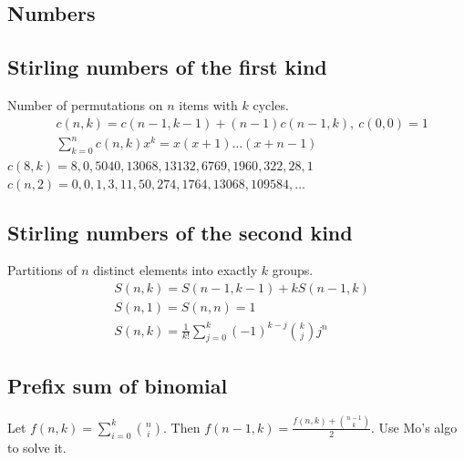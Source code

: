 \begin{compactmath}
\section{Numbers}
\subsection{Stirling numbers of the first kind} %
Number of permutations on $n$ items with $k$ cycles.
\begin{align*}
& c(n,k) = c(n-1,k-1) + (n-1) c(n-1,k),\ c(0,0) = 1 \\
& \textstyle \sum_{k=0}^n c(n,k)x^k = x(x+1) \dots (x+n-1)
\end{align*}
$c(8,k) = 8, 0, 5040, 13068, 13132, 6769, 1960, 322, 28, 1$ \\
$c(n,2) = 0, 0, 1, 3, 11, 50, 274, 1764, 13068, 109584, \dots$

\subsection{Stirling numbers of the second kind} %
Partitions of $n$ distinct elements into exactly $k$ groups.
\begin{align*}
& S(n, k) = S(n - 1, k - 1) + k S(n - 1,k) \\
& S(n, 1) = S(n, n) = 1 \\
& S(n, k) = \frac{1}{k!}\sum_{j = 0}^k (-1)^{k - j}\binom{k}{j}j^n
\end{align*}

\subsection{Prefix sum of binomial}
Let $f(n,k) = \sum_{i=0}^{k}\binom{n}{i}$.
Then $f(n-1,k)=\frac{f(n,k) + \binom{n-1}{k}}{2}$.
Use Mo's algo to solve it.


\end{compactmath}

